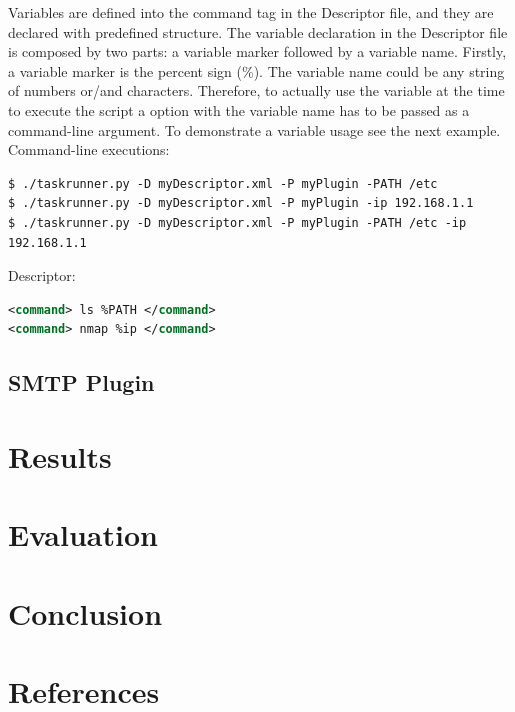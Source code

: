 \documentclass[a4paper, 12pt]{article}
\begin{document}
	Variables are defined into the command tag in the Descriptor file, and they are declared with predefined structure. The variable declaration in the
Descriptor file is composed by two parts: a variable marker followed by a variable name. Firstly, a variable marker is the percent sign (\%). The variable
name could be any string of numbers or/and characters. Therefore, to actually use the variable at the time to execute the script a option with the
variable name has to be passed as a command-line argument. To demonstrate a variable usage see the next example.\\

\noindent
Command-line executions:
\begin{lstlisting}
$ ./taskrunner.py -D myDescriptor.xml -P myPlugin -PATH /etc
$ ./taskrunner.py -D myDescriptor.xml -P myPlugin -ip 192.168.1.1
$ ./taskrunner.py -D myDescriptor.xml -P myPlugin -PATH /etc -ip 192.168.1.1 
\end{lstlisting}

\noindent
Descriptor:
\begin{lstlisting}[language=xml]
<command> ls %PATH </command>
<command> nmap %ip </command>
\end{lstlisting}

\subsection{SMTP Plugin}

\section{Results}

\section{Evaluation}

\section{Conclusion}



\newpage

\section*{References}
\end{document}
